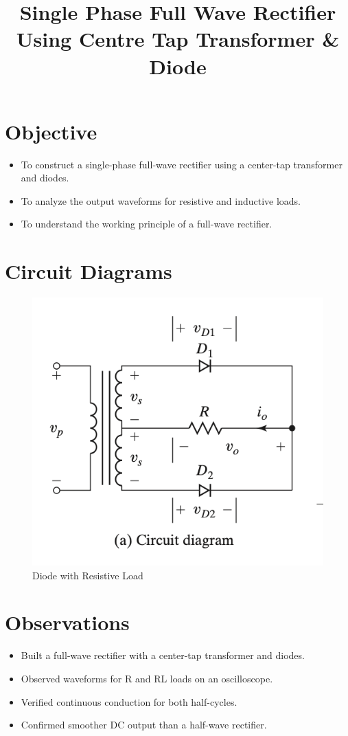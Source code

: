 \documentclass[12pt]{article}
\title{Single Phase Full Wave Rectifier Using Centre Tap Transformer \& Diode}
\author{}
\date{}
\begin{document}
\pagebreak
{}
\maketitle

\section*{Objective}
\begin{itemize}
    \item To construct a single-phase full-wave rectifier using a center-tap transformer and diodes.
    \item To analyze the output waveforms for resistive and inductive loads.
    \item To understand the working principle of a full-wave rectifier.
\end{itemize}

\section*{Circuit Diagrams}
\begin{figure}[H]
    \centering
    \includegraphics[width=.5\textwidth]{centre_ckt.png}
    \caption{Diode with Resistive Load \cite{rashid2013power}}
    \label{fig:dc_r_load}
\end{figure}

\section*{Observations}
\begin{itemize}
    \item Built a full-wave rectifier with a center-tap transformer and diodes.
    \item Observed waveforms for R and RL loads on an oscilloscope.
    \item Verified continuous conduction for both half-cycles.
    \item Confirmed smoother DC output than a half-wave rectifier.
\end{itemize}
\end{document}
